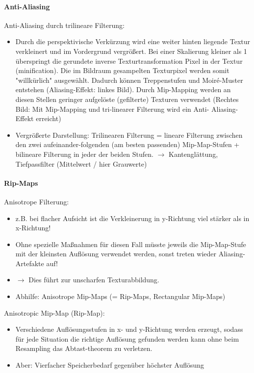 \documentclass[10pt,landscape]{article}
\begin{document}
\begin{multicols}{3}
\paragraph{Anti-Aliasing}
Anti-Aliasing durch trilineare Filterung:
\begin{itemize}
  \item Durch die perspektivische Verkürzung wird eine weiter hinten liegende Textur verkleinert und im Vordergrund vergrößert. Bei einer Skalierung kleiner als 1 überspringt die gerundete inverse Texturtransformation Pixel in der Textur (minification). Die im Bildraum gesampelten Texturpixel werden somit "willkürlich" ausgewählt. Dadurch können Treppenstufen und Moiré-Muster entstehen (Aliasing-Effekt: linkes Bild). Durch Mip-Mapping werden an diesen Stellen geringer aufgelöste (gefilterte) Texturen verwendet (Rechtes Bild: Mit Mip-Mapping und tri-linearer Filterung wird ein Anti- Aliasing-Effekt erreicht)
  \item Vergrößerte Darstellung: Trilinearen Filterung = lineare Filterung zwischen den zwei aufeinander-folgenden (am besten passenden) Mip-Map-Stufen + bilineare Filterung in jeder der beiden Stufen. $\rightarrow$ Kantenglättung, Tiefpassfilter (Mittelwert / hier Grauwerte)
\end{itemize}


\paragraph{Rip-Maps}
Anisotrope Filterung: 
\begin{itemize}
  \item z.B. bei flacher Aufsicht ist die Verkleinerung in y-Richtung viel stärker als in x-Richtung!
  \item Ohne spezielle Maßnahmen für diesen Fall müsste jeweils die Mip-Map-Stufe mit der kleinsten Auflösung verwendet werden, sonst treten wieder Aliasing-Artefakte auf!
  \item $\rightarrow$ Dies führt zur unscharfen Texturabbildung.
  \item Abhilfe: Anisotrope Mip-Maps (= Rip-Maps, Rectangular Mip-Maps)
\end{itemize}

Anisotropic Mip-Map (Rip-Map):
\begin{itemize}
  \item Verschiedene Auflösungsstufen in x- und y-Richtung werden erzeugt, sodass für jede Situation die richtige Auflösung gefunden werden kann ohne beim Resampling das Abtast-theorem zu verletzen.
  \item Aber: Vierfacher Speicherbedarf gegenüber höchster Auflösung
\end{itemize}


\end{multicols}
\end{document}
